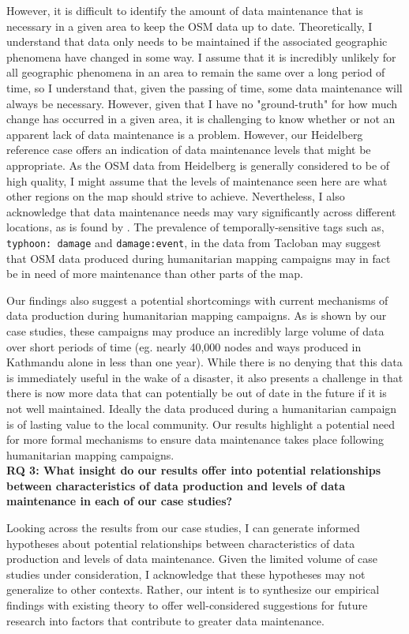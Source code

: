 However, it is difficult to identify the amount of data maintenance that is necessary in a given area to keep the OSM data up to date. Theoretically, I understand that data only needs to be maintained if the associated geographic phenomena have changed in some way. I assume that it is incredibly unlikely for all geographic phenomena in an area to remain the same over a long period of time, so I understand that, given the passing of time, some data maintenance will always be necessary. However, given that I have no "ground-truth" for how much change has occurred in a given area, it is challenging to know whether or not an apparent lack of data maintenance is a problem. However, our Heidelberg reference case offers an indication of data maintenance levels that might be appropriate. As the OSM data from Heidelberg is generally considered to be of high quality, I might assume that the levels of maintenance seen here are what other regions on the map should strive to achieve. Nevertheless, I also acknowledge that data maintenance needs may vary significantly across different locations, as is found by \textcite{quattrone_work_2017}. The prevalence of temporally-sensitive tags such as, \texttt{typhoon: damage} and \texttt{damage:event}, in the data from Tacloban may suggest that OSM data produced during humanitarian mapping campaigns may in fact be in need of more maintenance than other parts of the map.

Our findings also suggest a potential shortcomings with current mechanisms of data production during humanitarian mapping campaigns. As is shown by our case studies, these campaigns may produce an incredibly large volume of data over short periods of time (eg. nearly 40,000 nodes and ways produced in Kathmandu alone in less than one year). While there is no denying that this data is immediately useful in the wake of a disaster, it also presents a challenge in that there is now more data that can potentially be out of date in the future if it is not well maintained. Ideally the data produced during a humanitarian campaign is of lasting value to the local community. Our results highlight a potential need for more formal mechanisms to ensure data maintenance takes place following humanitarian mapping campaigns.\\

\noindent\textbf{RQ 3: What insight do our results offer into potential relationships between characteristics of data production and levels of data maintenance in each of our case studies?}

Looking across the results from our case studies, I can generate informed hypotheses about potential relationships between characteristics of data production and levels of data maintenance. Given the limited volume of case studies under consideration, I acknowledge that these hypotheses may not generalize to other contexts. Rather, our intent is to synthesize our empirical findings with existing theory to offer well-considered suggestions for future research into factors that contribute to greater data maintenance. 

